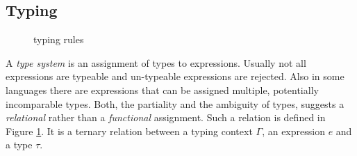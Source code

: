 {%
\subsection{Typing}\label{ssec:intro:typing}

\begin{figure}[t]
  \centering
  \caption{\stlcbool typing rules}
  \label{fig:intro:stlcbooltyping}
\end{figure}

A \emph{type system} is an assignment of types to expressions. Usually not all
expressions are typeable and un-typeable expressions are rejected. Also in some
languages there are expressions that can be assigned multiple, potentially
incomparable types. Both, the partiality and the ambiguity of types, suggests a
\emph{relational} rather than a \emph{functional} assignment. Such a relation is
defined in Figure \ref{fig:intro:stlcbooltyping}. It is a ternary relation
 between a typing context $\Gamma$,
an expression $e$ and a type $\tau$.

}

